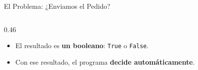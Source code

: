 \documentclass[aspectratio=169, 11pt]{beamer}
\begin{document}
\begin{frame}[shrink=10]{El Problema: ¿Enviamos el Pedido?}
\begin{columns}[c]
\begin{column}{0.46\textwidth}
{\begin{itemize}
        \item[{\color{arcaRed}\scriptsize\faArrowRight}]
          El resultado es \textbf{un booleano}:
          \texttt{True} o \texttt{False}.

        \item[{\color{arcaRed}\scriptsize\faArrowRight}]
          Con ese resultado, el programa
          \textbf{decide automáticamente}.
      \end{itemize}
      }
    \end{column}
  \end{columns}
\end{frame}

\end{document}
